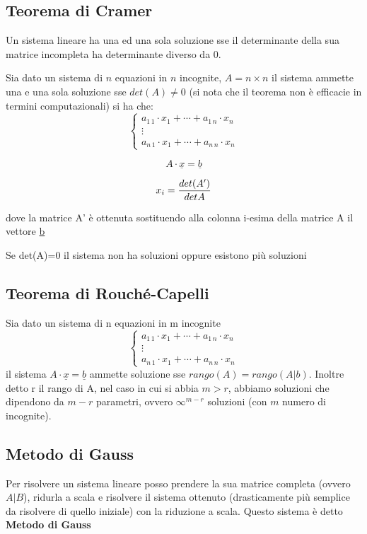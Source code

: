 \documentclass[a4paper,12pt, oneside]{book}
\begin{document}
\subsection{Teorema di Cramer}
\begin{teorema}[ di Cramer]
Un sistema lineare ha una ed una sola soluzione sse il determinante della sua matrice incompleta ha determinante diverso da 0. 
\end{teorema}
\begin{teorema}
Sia dato un sistema di $n$ equazioni in $n$ incognite, $A=n\times n$ il sistema ammette una e una sola soluzione sse $det(A)\neq 0$ (si nota che il teorema non è efficacie in termini computazionali)
si ha che:
$$\begin{cases}
a_{1\,1}\cdot x_1+\cdots+a_{1\,n}\cdot x_n\\
\vdots\\
a_{n\,1}\cdot x_1+\cdots+a_{n\,n}\cdot x_n
\end{cases}$$

$$A\cdot \underline{x}=\underline{b}$$

$$x_{i} = {{det(A')}\over{detA}}$$

dove la matrice A' è ottenuta sostituendo alla colonna i-esima della matrice A il vettore \underline{b}

Se det(A)=0 il sistema non ha soluzioni oppure esistono più soluzioni
\end{teorema}
\newpage
\subsection{Teorema di Rouché-Capelli}
\begin{teorema}
Sia dato un sistema di n equazioni in m incognite
$$\begin{cases}
a_{1\,1}\cdot x_1+\cdots+a_{1\,n}\cdot x_n\\
\vdots\\
a_{n\,1}\cdot x_1+\cdots+a_{n\,n}\cdot x_n
\end{cases}$$
il sistema $A\cdot \underline{x}=\underline{b}$ ammette soluzione sse $rango(A)=rango(A|b)$. Inoltre detto r il rango di A, nel caso in cui si abbia $m>r$, abbiamo soluzioni che dipendono da $m-r$ parametri, ovvero $\infty^{m-r}$ soluzioni (con $m$ numero di incognite).
\end{teorema}
\subsection{Metodo di Gauss}
Per risolvere un sistema lineare posso prendere la sua matrice completa (ovvero $A|B$), 	ridurla a scala e risolvere il sistema ottenuto (drasticamente più semplice da risolvere di quello iniziale) con la riduzione a scala. Questo sistema è detto \textbf{Metodo di Gauss}
\end{document}
